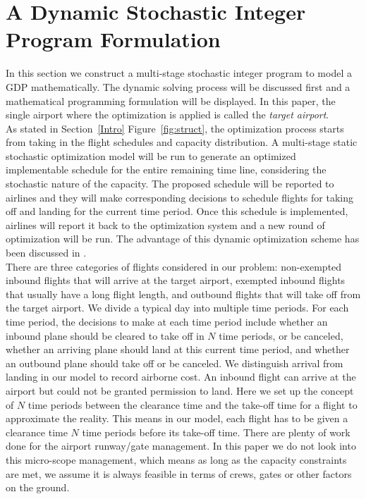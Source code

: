 \documentclass[12pt]{article}
\begin{document}
\section{A Dynamic Stochastic Integer Program Formulation}\label{Model}
	In this section we construct a multi-stage stochastic integer program to model a GDP mathematically. The dynamic solving process will be discussed first and a mathematical programming formulation will be displayed. In this paper, the single airport where the optimization is applied is called the {\em target airport}.\\
	\newline As stated in Section~\ref{Intro} Figure~\ref{fig:struct}, the optimization process starts from taking in the flight schedules and capacity distribution. A multi-stage static stochastic optimization model will be run to generate an optimized implementable schedule for the entire remaining time line, considering the stochastic nature of the capacity. The proposed schedule will be reported to airlines and they will make corresponding decisions to schedule flights for taking off and landing for the current time period. Once this schedule is implemented, airlines will report it back to the optimization system and a new round of optimization will be run. The advantage of this dynamic optimization scheme has been discussed in \cite{richetta1994dynamic}. \\
	\newline There are three categories of flights considered in our problem: non-exempted inbound flights that will arrive at the target airport, exempted inbound flights that usually have a long flight length, and outbound flights that will take off from the target airport. 
	\newline
	We divide a typical day into multiple time periods. For each time period, the decisions to make at each time period include whether an inbound plane should be cleared to take off in \(N\) time periods, or be canceled, whether an arriving plane should land at this current time period, and whether an outbound plane should take off or be canceled. We distinguish  arrival from landing in our model to record airborne cost. An inbound flight can arrive at the airport but could not be granted permission to land. Here we set up the concept of \(N\) time periods between the clearance time and the take-off time for a flight to approximate the reality. This means in our model, each flight has to be given a clearance time \(N\) time periods before its take-off time. There are plenty of work done for the airport runway/gate management. In this paper we do not look into this micro-scope management, which means as long as the capacity constraints are met, we assume it is always feasible in terms of crews, gates or other factors on the ground.\\
\end{document}
